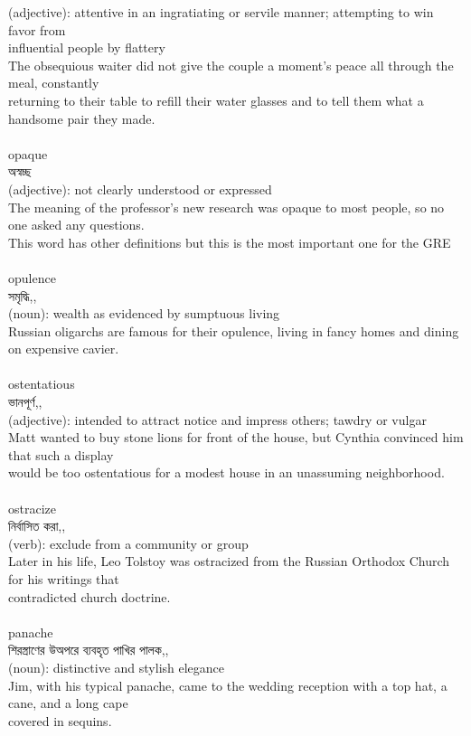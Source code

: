 \documentclass{article}
\begin{document}
{(adjective): attentive in an ingratiating or servile manner; attempting to win favor from\\influential people by flattery\\The obsequious waiter did not give the couple a moment's peace all through the meal, constantly\\returning to their table to refill their water glasses and to tell them what a handsome pair they made.\\}\\
{opaque}\\
{অস্বচ্ছ}\\
{(adjective): not clearly understood or expressed\\The meaning of the professor's new research was opaque to most people, so no one asked any questions.\\This word has other definitions but this is the most important one for the GRE\\}\\
{opulence}\\
{সমৃদ্ধি,,}\\
{(noun): wealth as evidenced by sumptuous living\\Russian oligarchs are famous for their opulence, living in fancy homes and dining on expensive cavier.\\}\\
{ostentatious}\\
{ভানপূর্ণ,,}\\
{(adjective): intended to attract notice and impress others; tawdry or vulgar\\Matt wanted to buy stone lions for front of the house, but Cynthia convinced him that such a display\\would be too ostentatious for a modest house in an unassuming neighborhood.\\}\\
{ostracize}\\
{নির্বাসিত করা,,}\\
{(verb): exclude from a community or group\\Later in his life, Leo Tolstoy was ostracized from the Russian Orthodox Church for his writings that\\contradicted church doctrine.\\}\\
{panache}\\
{শিরস্ত্রাণের উঅপরে ব্যবহৃত পাখির পালক,,}\\
{(noun): distinctive and stylish elegance\\Jim, with his typical panache, came to the wedding reception with a top hat, a cane, and a long cape\\covered in sequins.\\}\\
\end{document}

